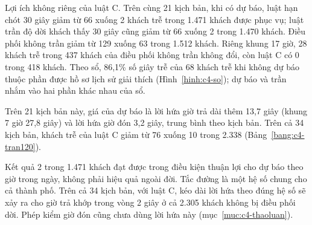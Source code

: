 Lợi ích không riêng của luật C. Trên cùng 21 kịch bản, khi có dự báo, luật hạn chót 30 giây giảm từ 66 xuống 2 khách
trễ trong 1.471 khách được phục vụ; luật trần độ dời khách thấy 30 giây cũng giảm từ 66 xuống 2 trong 1.470 khách.
Điều phối không trần giảm từ 129 xuống 63 trong 1.512 khách. Riêng khung 17 giờ, 28 khách trễ trong 437 khách của điều
phối không trần không đổi, còn luật C có 0 trong 418 khách. Theo sổ, 86,1\% số giây trễ của 68 khách trễ khi không dự
báo thuộc phần được hồ sơ lịch sử giải thích (Hình~\ref{hinh:c4-so}); dự báo và trần nhắm vào hai phần khác nhau của sổ.

Trên 21 kịch bản này, giá của dự báo là lời hứa giờ trả dài thêm 13,7 giây (khung 7 giờ 27,8 giây) và lời hứa giờ đón 3,2 giây, trung bình
theo kịch bản. Trên cả 34 kịch bản, khách trễ của luật C giảm từ 76 xuống 10 trong 2.338 (Bảng~\ref{bang:c4-tran120}).

Kết quả 2 trong 1.471 khách đạt được trong điều kiện thuận lợi cho dự báo theo giờ trong ngày, không phải hiệu quả ngoài
đời. Tắc đường là một hệ số chung cho cả thành phố. Trên cả 34 kịch bản, với luật C, kéo dài lời hứa theo đúng hệ số
sẽ xảy ra cho giờ trả khớp trong vòng 2 giây ở cả 2.305 khách không bị điều phối dời. Phép kiểm giờ đón cũng chưa dùng
lời hứa này (mục~\ref{muc:c4-thaoluan}).

